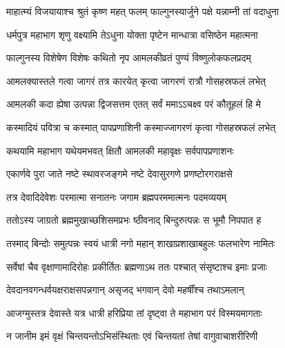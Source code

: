 \label{sec:padma-phalguna-shuklamalaki}

\ganapatyadiDhyanam
\padmaPuranam



\twolineshloka
{माहात्म्यं विजयायाश्च श्रुतं कृष्ण महत् फलम्}
{फाल्गुनस्यार्जुने पक्षे यन्नाम्नी तां वदाधुना}%


\twolineshloka
{धर्मपुत्र महाभाग शृणु वक्ष्यामि तेऽधुना}
{योक्ता पृष्टेन मान्धात्रा वसिष्ठेन महात्मना}%

\twolineshloka
{फाल्गुनस्य विशेषेण विशेषः कथितो नृप}
{आमलकीव्रतं पुण्यं विष्णुलोकफलप्रदम्}%

\twolineshloka
{आमलक्यास्तले गत्वा जागरं तत्र कारयेत्}
{कृत्वा जागरणं रात्रौ गोसहस्रफलं लभेत्}%


\twolineshloka
{आमलकी कदा ह्येषा उत्पन्ना द्विजसत्तम}
{एतत् सर्वं ममाऽऽचक्ष्व परं कौतूहलं हि मे}%

\twolineshloka
{कस्मादियं पवित्रा च कस्मात् पापप्रणाशिनी}
{कस्माज्जागरणं कृत्वा गोसहस्रफलं लभेत्}%


\twolineshloka
{कथयामि महाभाग यथेयमभवत् क्षितौ}
{आमलकी महावृक्षः सर्वपापप्रणाशनः}%

\twolineshloka
{एकार्णवे पुरा जाते नष्टे स्थावरजङ्गमे}
{नष्टे देवासुरगणे प्रणष्टोरगराक्षसे}%

\twolineshloka
{तत्र देवादिदेवेशः परमात्मा सनातनः}
{जगाम ब्रह्मपरममात्मनः पदमव्ययम्}%

\twolineshloka
{ततोऽस्य जाग्रतो ब्रह्ममुखाच्छशिसमप्रभः}
{ष्ठीवनाद् बिन्दुरुत्पन्नः स भूमौ निपपात ह}%

\twolineshloka
{तस्माद् बिन्दोः समुत्पन्नः स्वयं धात्री नगो महान्}
{शाखाप्रशाखाबहुलः फलभारेण नामितः}%

\twolineshloka
{सर्वेषां चैव वृक्षाणामादिरोहः प्रकीर्तितः}
{ब्रह्मणाऽथ ततः पश्चात् संसृष्टाश्च इमाः प्रजाः}%

\twolineshloka
{देवदानवगन्धर्वयक्षराक्षसपन्नगान्}
{असृजद् भगवान् देवो महर्षींश्च तथाऽमलान्}%

\twolineshloka
{आजग्मुस्तत्र देवास्ते यत्र धात्री हरिप्रिया}
{तां दृष्ट्वा ते महाभाग परं विस्मयमागताः}%

\twolineshloka
{न जानीम इमं वृक्षं चिन्तयन्तोऽभिसंस्थिताः}
{एवं चिन्तयतां तेषां वागुवाचाशरीरिणी}%

